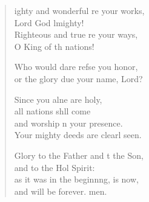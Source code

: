 \settowidth{\versewidth}{Mighty and wonderful are your works, *}
\begin{verse}%
  \begin{patverse}
ighty and wonderful re your works,\Med\\
Lord God lmighty!\\
Righteous and true re your ways,\Med\\
O King of th nations!

Who would dare refse you honor,\Med\\
or the glory due your name,  Lord?

Since you alne are holy,\Med\\
all nations shll come\\
and worship \pointup{\i}n your presence.\Med\\
Your mighty deeds are clearl seen.

Glory to the Father and t the Son,\Med\\
and to the Hol Spirit:\\
as it was in the beginn\pointup{\i}ng, is now,\Med\\
and will be forever. men.
  \end{patverse}
\end{verse}
